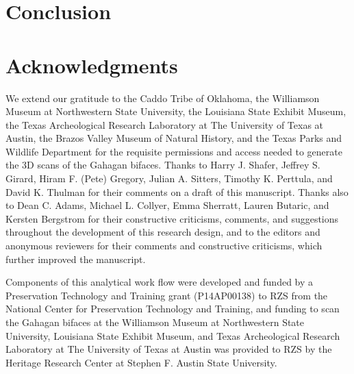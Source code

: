 \documentclass[review]{elsarticle}
\begin{document}
\section*{Conclusion}

\section*{Acknowledgments}

We extend our gratitude to the Caddo Tribe of Oklahoma, the Williamson Museum at Northwestern State University, the Louisiana State Exhibit Museum, the Texas Archeological Research Laboratory at The University of Texas at Austin, the Brazos Valley Museum of Natural History, and the Texas Parks and Wildlife Department for the requisite permissions and access needed to generate the 3D scans of the Gahagan bifaces. Thanks to Harry J. Shafer, Jeffrey S. Girard, Hiram F. (Pete) Gregory, Julian A. Sitters, Timothy K. Perttula, and David K. Thulman for their comments on a draft of this manuscript. Thanks also to Dean C. Adams, Michael L. Collyer, Emma Sherratt, Lauren Butaric, and Kersten Bergstrom for their constructive criticisms, comments, and suggestions throughout the development of this research design, and to the editors and anonymous reviewers for their comments and constructive criticisms, which further improved the manuscript.

Components of this analytical work flow were developed and funded by a Preservation Technology and Training grant (P14AP00138) to RZS from the National Center for Preservation Technology and Training, and funding to scan the Gahagan bifaces at the Williamson Museum at Northwestern State University, Louisiana State Exhibit Museum, and Texas Archeological Research Laboratory at The University of Texas at Austin was provided to RZS by the Heritage Research Center at Stephen F. Austin State University.


\end{document}
